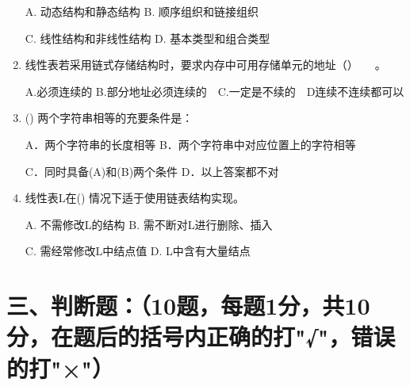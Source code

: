 \documentclass{../../note}
\begin{document}
\begin{enumerate}
A. 动态结构和静态结构 B. 顺序组织和链接组织

C. 线性结构和非线性结构 D. 基本类型和组合类型

\item 线性表若采用链式存储结构时，要求内存中可用存储单元的地址（\hspace{0.5cm}）　　。

A.必须连续的 B.部分地址必须连续的　C.一定是不续的　D连续不连续都可以

\item (\hspace{0.5cm}) 两个字符串相等的充要条件是：

A．两个字符串的长度相等 B．两个字符串中对应位置上的字符相等

C．同时具备(A)和(B)两个条件 D．以上答案都不对

\item 线性表L在(\hspace{0.5cm}) 情况下适于使用链表结构实现。

A. 不需修改L的结构 B. 需不断对L进行删除、插入

C. 需经常修改L中结点值 D. L中含有大量结点
\end{enumerate}



\section*{三、判断题：（10题，每题1分，共10分，在题后的括号内正确的打"√"，错误的打"×"）}
\end{document}
